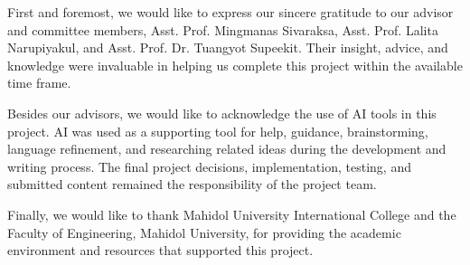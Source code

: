 First and foremost, we would like to express our sincere gratitude to our advisor and committee members, Asst. Prof. Mingmanas Sivaraksa, Asst. Prof. Lalita Narupiyakul, and Asst. Prof. Dr. Tuangyot Supeekit. Their insight, advice, and knowledge were invaluable in helping us complete this project within the available time frame.

Besides our advisors, we would like to acknowledge the use of AI tools in this project. AI was used as a supporting tool for help, guidance, brainstorming, language refinement, and researching related ideas during the development and writing process. The final project decisions, implementation, testing, and submitted content remained the responsibility of the project team.

Finally, we would like to thank Mahidol University International College and the Faculty of Engineering, Mahidol University, for providing the academic environment and resources that supported this project.
